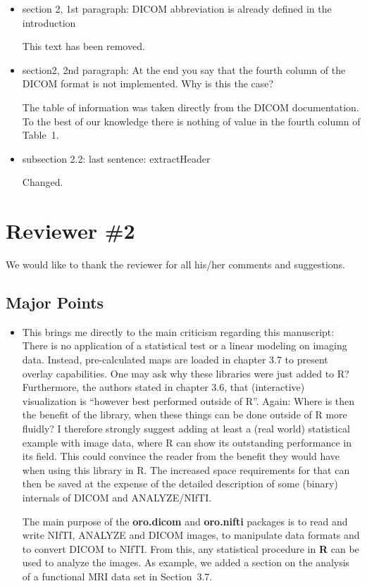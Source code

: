 \documentclass[11pt]{article}
\begin{document}
\begin{itemize} 

\item section 2, 1st paragraph: DICOM abbreviation is already defined
  in the introduction

  This text has been removed.

\item section2, 2nd paragraph: At the end you say that the fourth
  column of the DICOM format is not implemented. Why is this the case?

  The table of information was taken directly from the DICOM
  documentation.  To the best of our knowledge there is nothing of
  value in the fourth column of Table~1.

\item subsection 2.2: last sentence: extractHeader

  Changed.

\end{itemize}

\section*{Reviewer \#2}

We would like to thank the reviewer for all his/her comments and
suggestions.

\subsection*{Major Points}

\begin{itemize}

\item This brings me directly to the main criticism regarding this
  manuscript: There is no application of a statistical test or a
  linear modeling on imaging data.  Instead, pre-calculated maps are
  loaded in chapter 3.7 to present overlay capabilities.  One may ask
  why these libraries were just added to R?  Furthermore, the authors
  stated in chapter 3.6, that (interactive) visualization is ``however
  best performed outside of R''.  Again: Where is then the benefit of
  the library, when these things can be done outside of R more
  fluidly?
  I therefore strongly suggest adding at least a (real world)
  statistical example with image data, where R can show its
  outstanding performance in its field.  This could convince the
  reader from the benefit they would have when using this library in
  R. The increased space requirements for that can then be saved at
  the expense of the detailed description of some (binary) internals
  of DICOM and ANALYZE/NIfTI.

  The main purpose of the \textbf{oro.dicom} and \textbf{oro.nifti}
  packages is to read and write NIfTI, ANALYZE and DICOM images, to 
  manipulate data formats and to convert DICOM to NIfTI. From this, 
  any statistical procedure in \textbf{R} can be used to analyze the
  images. As example, we added a section on the analysis of a functional MRI 
  data set in Section~3.7.  

\end{itemize}
\end{document}
